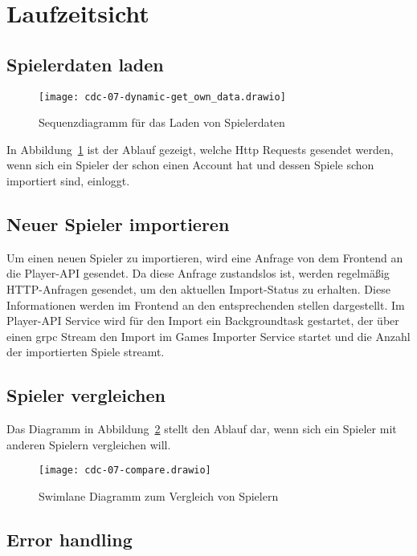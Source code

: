 \section{Laufzeitsicht}
\subsection{Spielerdaten laden}
\begin{figure}
    \centering
    \texttt{[image: cdc-07-dynamic-get\_own\_data.drawio]}
    \caption{Sequenzdiagramm für das Laden von Spielerdaten}
    \label{fig:load-data}
\end{figure}

In Abbildung~\ref{fig:load-data} ist der Ablauf gezeigt, welche Http Requests gesendet werden, wenn sich ein Spieler
der schon einen Account hat und dessen Spiele schon importiert sind, einloggt.


\subsection{Neuer Spieler importieren}

Um einen neuen Spieler zu importieren, wird eine Anfrage von dem Frontend an die Player-API gesendet.
Da diese Anfrage zustandslos ist, werden regelmäßig HTTP-Anfragen gesendet, um den aktuellen Import-Status
zu erhalten.
Diese Informationen werden im Frontend an den entsprechenden stellen dargestellt.
Im Player-API Service wird für den Import ein Backgroundtask gestartet, der über einen grpc Stream den Import im
Games Importer Service startet und die Anzahl der importierten Spiele streamt.


\subsection{Spieler vergleichen}

Das Diagramm in Abbildung~\ref{fig:compare-diagram} stellt den Ablauf dar, wenn sich ein Spieler mit anderen Spielern vergleichen will.

\begin{figure}[H]
    \centering
    \texttt{[image: cdc-07-compare.drawio]}
    \caption{Swimlane Diagramm zum Vergleich von Spielern}
    \label{fig:compare-diagram}
\end{figure}

\subsection{Error handling}

